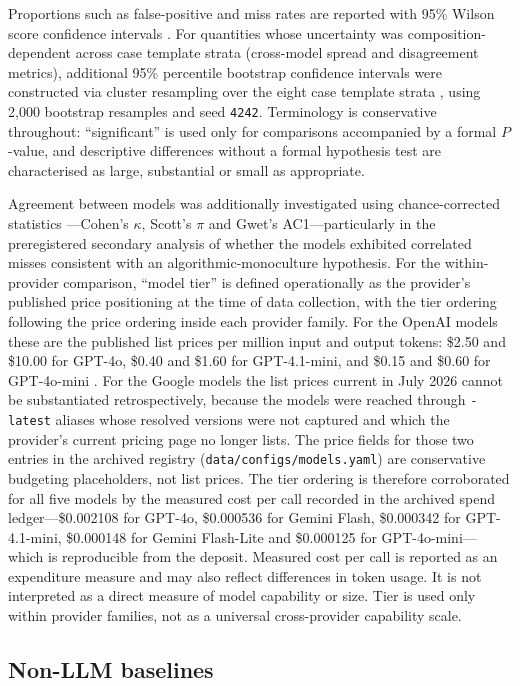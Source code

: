 \documentclass[pdflatex,sn-basic,Numbered]{sn-jnl}
\begin{document}
Proportions such as false-positive and miss rates are reported with 95\% Wilson score confidence intervals \cite{wilson}. For quantities whose uncertainty was composition-dependent across case template strata (cross-model spread and disagreement metrics), additional 95\% percentile bootstrap confidence intervals were constructed via cluster resampling over the eight case template strata \cite{bootstrap}, using 2{,}000 bootstrap resamples and seed \texttt{4242}. Terminology is conservative throughout: ``significant'' is used only for comparisons accompanied by a formal $P$-value, and descriptive differences without a formal hypothesis test are characterised as large, substantial or small as appropriate.

Agreement between models was additionally investigated using chance-corrected statistics \cite{gwet}---Cohen's $\kappa$, Scott's $\pi$ and Gwet's AC1---particularly in the preregistered secondary analysis of whether the models exhibited correlated misses consistent with an algorithmic-monoculture hypothesis. For the within-provider comparison, ``model tier'' is defined operationally as the provider's published price positioning at the time of data collection, with the tier ordering following the price ordering inside each provider family. For the OpenAI models these are the published list prices per million input and output tokens: \$2.50 and \$10.00 for GPT-4o, \$0.40 and \$1.60 for GPT-4.1-mini, and \$0.15 and \$0.60 for GPT-4o-mini \cite{openai-pricing}. For the Google models the list prices current in July 2026 cannot be substantiated retrospectively, because the models were reached through \texttt{-latest} aliases whose resolved versions were not captured and which the provider's current pricing page no longer lists. The price fields for those two entries in the archived registry (\texttt{data/configs/models.yaml}) are conservative budgeting placeholders, not list prices. The tier ordering is therefore corroborated for all five models by the measured cost per call recorded in the archived spend ledger---\$0.002108 for GPT-4o, \$0.000536 for Gemini Flash, \$0.000342 for GPT-4.1-mini, \$0.000148 for Gemini Flash-Lite and \$0.000125 for GPT-4o-mini---which is reproducible from the deposit. Measured cost per call is reported as an expenditure measure and may also reflect differences in token usage. It is not interpreted as a direct measure of model capability or size. Tier is used only within provider families, not as a universal cross-provider capability scale.

\subsection{Non-LLM baselines}
\end{document}
